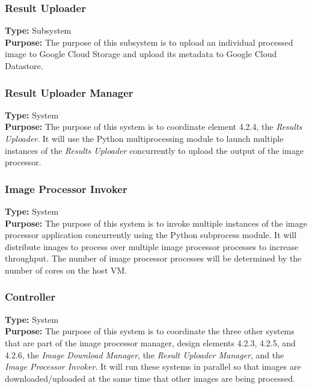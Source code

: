 \documentclass[10pt, onecolumn, draftclsnofoot, letterpaper, compsoc]{IEEEtran}
\begin{document}
    \subsubsection{Result Uploader}
    \textbf{Type:} Subsystem \\
    \textbf{Purpose:} The purpose of this subsystem is to upload an individual processed image to Google Cloud
    Storage and upload its metadata to Google Cloud Datastore. \\

    \subsubsection{Result Uploader Manager}
    \textbf{Type:} System \\
    \textbf{Purpose:} The purpose of this system is to coordinate element 4.2.4, the \textit{Results Uploader}.
    It will use the Python multiprocessing module to launch multiple instances of the \textit{Results Uploader}
    concurrently to upload the output of the image processor. \\

    \subsubsection{Image Processor Invoker}
    \textbf{Type:} System \\
    \textbf{Purpose:} The purpose of this system is to invoke multiple instances of the image processor
    application concurrently using the Python subprocess module. It will distribute images to process over
    multiple image processor processes to increase throughput. The number of image processor processes will be
    determined by the number of cores on the host VM. \\

    \subsubsection{Controller}
    \textbf{Type:} System \\
    \textbf{Purpose:} The purpose of this system is to coordinate the three other systems that are part of the
    image processor manager, design elements 4.2.3, 4.2.5, and 4.2.6, the \textit{Image Download Manager},
    the \textit{Result Uploader Manager}, and the \textit{Image Processor Invoker}. It will run these systems
    in parallel so that images are downloaded/uploaded at the same time that other images are being
    processed. \\
\end{document}
